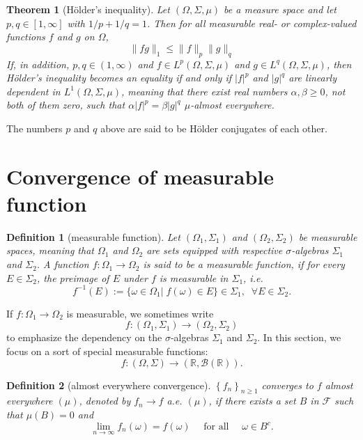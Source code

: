 \documentclass{report}
\newtheorem{definition}{Definition}[section]
\newtheorem{theorem}{Theorem}[section]
\theoremstyle{nonumberplain}
\begin{document}
\begin{theorem}[Hölder's inequality]
	Let $(\Omega, \Sigma, \mu)$ be a measure space and let $p, q \in[1, \infty]$ with $1 / p+1 / q=1$. Then for all measurable real- or complex-valued functions $f$ and $g$ on $\Omega$,
\[
\|f g\|_{1} \leq\|f\|_{p}\|g\|_{q}
\]
If, in addition, $p, q \in(1, \infty)$ and $f \in L^{p}(\Omega, \Sigma, \mu)$ and $g \in L^{q}(\Omega, \Sigma, \mu)$, then Hölder's inequality becomes an equality if and only if $|f|^{p}$ and $|g|^{q}$ are linearly dependent in $L^{1}(\Omega, \Sigma, \mu)$, meaning that there exist real numbers $\alpha, \beta \geq 0$, not both of them zero, such that $\alpha|f|^{p}=\beta|g|^{q}$ $\mu$-almost everywhere.
\end{theorem}

The numbers $p$ and $q$ above are said to be Hölder conjugates of each other. 

\section{Convergence of measurable function}
\begin{definition}[measurable function]
	Let $(\Omega_1,\Sigma_1 )$ and $(\Omega_2,\Sigma_2)$ be measurable spaces, meaning that $\Omega_1$ and $\Omega_2$ are sets equipped with respective $\sigma$-algebras $\Sigma_1$ and $\Sigma_2$. A function $f:\Omega_1\to \Omega_2$ is said to be a \emph{measurable function}, if for every $E\in \Sigma_2$, the preimage of $E$ under $f$ is measurable in $\Sigma_1$, i.e.
	\[
	f^{-1}(E):=\{\omega\in \Omega_1|\;f(\omega)\in E\}\in \Sigma_1 ,\;\;\forall E\in\Sigma_2.
	\]
\end{definition}
If $f:\Omega_1\to \Omega_2$ is measurable, we sometimes write
$$f\colon (\Omega_1,\Sigma_1 )\rightarrow (\Omega_2,\Sigma_2 )$$
to emphasize the dependency on the $\sigma$-algebras $\Sigma_1$ and $\Sigma_2$.
In this section, we focus on a sort of special measurable functions:
\[
f\colon (\Omega,\Sigma )\rightarrow (\mathbb{R},\mathcal{B}(\mathbb{R}) ).
\]   

\begin{definition}[almost everywhere convergence]
	$\left\{f_{n}\right\}_{n \geq 1}$ converges to $f$ almost everywhere $(\mu)$, denoted by $f_{n} \rightarrow f$ a.e. $(\mu)$, if there exists a set $B$ in $\mathcal{F}$ such that $\mu(B)=0$ and
	$$
	\lim _{n \rightarrow \infty} f_{n}(\omega)=f(\omega) \quad \text { for all } \quad \omega \in B^{c} .
	$$
\end{definition}
\end{document}
